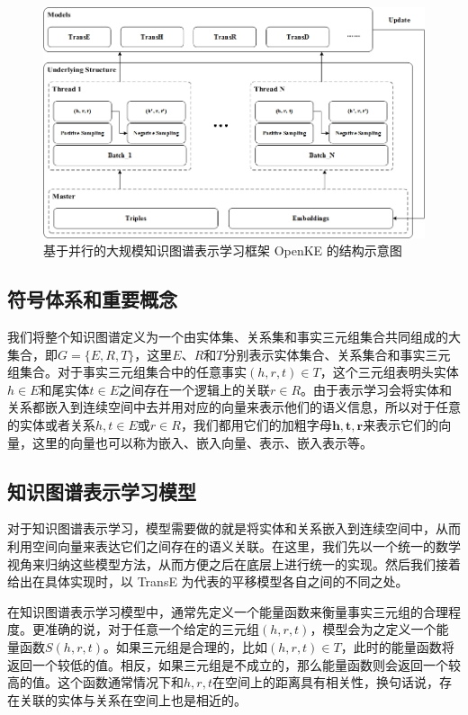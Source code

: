 \vspace{25pt}
\begin{figure}[h]
\setlength{\abovecaptionskip}{30pt} 
\centering
\includegraphics[width=1.0\linewidth]{figures/ch2/3.jpg}
\caption{基于并行的大规模知识图谱表示学习框架 OpenKE 的结构示意图}
\label{fig2:openke}
\end{figure}

\subsection{符号体系和重要概念}

我们将整个知识图谱定义为一个由实体集、关系集和事实三元组集合共同组成的大集合，即$G = \{E, R, T\}$，这里$E$、$R$和$T$分别表示实体集合、关系集合和事实三元组集合。对于事实三元组集合中的任意事实$(h, r, t) \in T$，这个三元组表明头实体$h \in E$和尾实体$t \in E$之间存在一个逻辑上的关联$r \in R$。由于表示学习会将实体和关系都嵌入到连续空间中去并用对应的向量来表示他们的语义信息，所以对于任意的实体或者关系$h, t \in E$或$r \in R$，我们都用它们的加粗字母$\mathbf{h}, \mathbf{t}, \mathbf{r}$来表示它们的向量，这里的向量也可以称为嵌入、嵌入向量、表示、嵌入表示等。

\subsection{知识图谱表示学习模型}
\label{ch2:knowledgemodels}

对于知识图谱表示学习，模型需要做的就是将实体和关系嵌入到连续空间中，从而利用空间向量来表达它们之间存在的语义关联。在这里，我们先以一个统一的数学视角来归纳这些模型方法，从而方便之后在底层上进行统一的实现。然后我们接着给出在具体实现时，以 TransE 为代表的平移模型各自之间的不同之处。

在知识图谱表示学习模型中，通常先定义一个能量函数来衡量事实三元组的合理程度。更准确的说，对于任意一个给定的三元组$(h, r, t)$，模型会为之定义一个能量函数$S(h, r, t)$。如果三元组是合理的，比如$(h, r, t)\in T$，此时的能量函数将返回一个较低的值。相反，如果三元组是不成立的，那么能量函数则会返回一个较高的值。这个函数通常情况下和$h, r, t$在空间上的距离具有相关性，换句话说，存在关联的实体与关系在空间上也是相近的。

